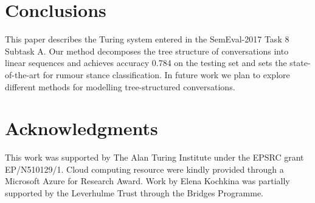 \documentclass[11pt,a4paper]{article}
\begin{document}
\section{Conclusions}
This paper describes the Turing system entered in the SemEval-2017 Task 8 Subtask A. Our method decomposes the tree structure of conversations into linear sequences and achieves accuracy 0.784 on the testing set and sets the state-of-the-art for rumour stance classification. In future work we plan to explore different methods for modelling tree-structured conversations. 
\section*{Acknowledgments}
This work was supported by The Alan Turing Institute under the EPSRC grant EP/N510129/1. Cloud computing resource were kindly provided through a Microsoft Azure for Research Award. Work by Elena Kochkina was partially supported by the Leverhulme Trust through the Bridges Programme.



\end{document}
